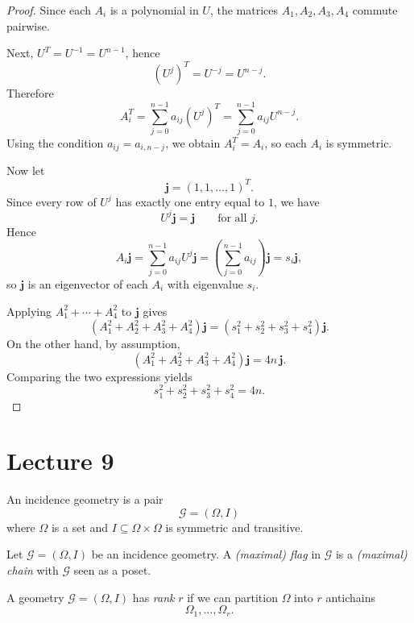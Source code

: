 \documentclass[11pt, a4paper]{ctexrep}
\begin{document}
    \begin{proof}
    Since each $A_i$ is a polynomial in $U$, the matrices $A_1,A_2,A_3,A_4$ commute pairwise.
    
    Next, $U^T=U^{-1}=U^{n-1}$, hence
    \[
    (U^j)^T=U^{-j}=U^{n-j}.
    \]
    Therefore
    \[
    A_i^T
    =
    \sum_{j=0}^{n-1} a_{ij}(U^j)^T
    =
    \sum_{j=0}^{n-1} a_{ij}U^{n-j}.
    \]
    Using the condition $a_{ij}=a_{i,n-j}$, we obtain $A_i^T=A_i$, so each $A_i$ is symmetric.
    
    Now let
    \[
    \mathbf{j}=(1,1,\dots,1)^T.
    \]
    Since every row of $U^j$ has exactly one entry equal to $1$, we have
    \[
    U^j\mathbf{j}=\mathbf{j}
    \qquad\text{for all }j.
    \]
    Hence
    \[
    A_i\mathbf{j}
    =
    \sum_{j=0}^{n-1} a_{ij}U^j\mathbf{j}
    =
    \left(\sum_{j=0}^{n-1} a_{ij}\right)\mathbf{j}
    =
    s_i\mathbf{j},
    \]
    so $\mathbf{j}$ is an eigenvector of each $A_i$ with eigenvalue $s_i$.
    
    Applying $A_1^2+\cdots+A_4^2$ to $\mathbf{j}$ gives
    \[
    (A_1^2+A_2^2+A_3^2+A_4^2)\mathbf{j}
    =
    (s_1^2+s_2^2+s_3^2+s_4^2)\mathbf{j}.
    \]
    On the other hand, by assumption,
    \[
    (A_1^2+A_2^2+A_3^2+A_4^2)\mathbf{j}
    =
    4n\,\mathbf{j}.
    \]
    Comparing the two expressions yields
    \[
    s_1^2+s_2^2+s_3^2+s_4^2=4n.
    \]
    \end{proof}




\chapter{Lecture 9}

\begin{definition}
    An incidence geometry is a pair
    \[
    \mathcal{G}=(\Omega,I)
    \]
    where $\Omega$ is a set and $I\subseteq \Omega\times\Omega$ is symmetric and transitive.
    \end{definition}
    
    \begin{definition}
    Let $\mathcal{G}=(\Omega,I)$ be an incidence geometry. A \emph{(maximal) flag} in $\mathcal{G}$ is a \emph{(maximal) chain} with $\mathcal{G}$ seen as a poset.
    \end{definition}
    
    \begin{definition}
    A geometry $\mathcal{G}=(\Omega,I)$ has \emph{rank} $r$ if we can partition $\Omega$ into $r$ antichains
    \[
    \Omega_1,\dots,\Omega_r.
    \]
    \end{definition}
    
\end{document}
